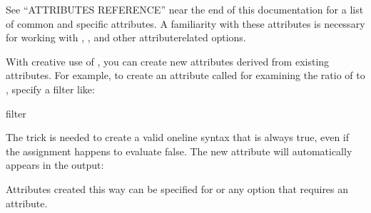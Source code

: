 \documentclass[letterpaper,10pt,english]{sphinxmanual}
\begin{document}
See “ATTRIBUTES REFERENCE” near the end of this documentation for a list
of common and {\hyperref[\detokenize{mariadb-query-digest:cmdoption-mariadb-query-digest-type}]{}} specific attributes.  A familiarity with these
attributes is necessary for working with {\hyperref[\detokenize{mariadb-query-digest:cmdoption-mariadb-query-digest-filter}]{}},
{\hyperref[\detokenize{mariadb-query-digest:cmdoption-mariadb-query-digest-ignore-attributes}]{}}, and other attribute\sphinxhyphen{}related options.

With creative use of {\hyperref[\detokenize{mariadb-query-digest:cmdoption-mariadb-query-digest-filter}]{}}, you can create new attributes derived
from existing attributes.  For example, to create an attribute called
 for examining the ratio of  to ,
specify a filter like:

\begin{sphinxVerbatim}[commandchars=\\\{\}]
\PYGZhy{}\PYGZhy{}filter 
\end{sphinxVerbatim}

The  trick is needed to create a valid one\sphinxhyphen{}line syntax that is always
true, even if the assignment happens to evaluate false.  The new attribute will
automatically appears in the output:

\begin{sphinxVerbatim}[commandchars=\\\{\}]
\end{sphinxVerbatim}

Attributes created this way can be specified for {\hyperref[\detokenize{mariadb-query-digest:cmdoption-mariadb-query-digest-order-by}]{}} or any
option that requires an attribute.
\end{document}
